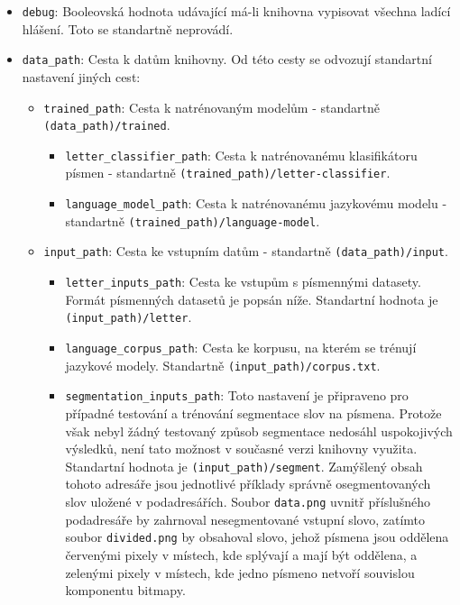 \documentclass[a4paper]{article}
\begin{document}
\begin{itemize}
\item \texttt{debug}: Booleovská hodnota udávající má-li knihovna vypisovat
	všechna ladící hlášení. Toto se standartně neprovádí.
\item \texttt{data\_path}: Cesta k datům knihovny. Od této cesty se odvozují
	standartní nastavení jiných cest:
	\begin{itemize}
	\item \texttt{trained\_path}: Cesta k natrénovaným modelům - standartně
		\texttt{(data\_path)/trained}.
		\begin{itemize}
		\item \texttt{letter\_classifier\_path}: Cesta k natrénovanému
			klasifikátoru písmen - standartně
			\texttt{(trained\_path)/letter-classifier}.
		\item \texttt{language\_model\_path}: Cesta k natrénovanému
			jazykovému modelu - standartně
			\texttt{(trained\_path)/language-model}.
		\end{itemize}
	\item \texttt{input\_path}: Cesta ke vstupním datům - standartně
		\texttt{(data\_path)/input}.
		\begin{itemize}
		\item \texttt{letter\_inputs\_path}: Cesta ke vstupům s
			písmennými datasety. Formát písmenných datasetů je
			popsán níže. Standartní hodnota je
			\texttt{(input\_path)/letter}.

		\item \texttt{language\_corpus\_path}: Cesta ke korpusu,
			na kterém se trénují jazykové modely.
			Standartně \texttt{(input\_path)/corpus.txt}.

		\item
			\texttt{segmentation\_inputs\_path}: Toto nastavení
			je připraveno pro případné testování a trénování
			segmentace slov na písmena. Protože však nebyl
			žádný testovaný způsob segmentace nedosáhl uspokojivých
			výsledků, není tato možnost v současné verzi knihovny využita.
			Standartní hodnota je \texttt{(input\_path)/segment}.
			Zamýšlený obsah tohoto adresáře jsou jednotlivé příklady
			správně osegmentovaných slov uložené v podadresářích.
			Soubor \texttt{data.png} uvnitř příslušného podadresáře
			by zahrnoval nesegmentované vstupní slovo, zatímto
			soubor \texttt{divided.png} by obsahoval slovo, jehož
			písmena jsou oddělena červenými pixely v místech, kde
			splývají a mají být oddělena, a zelenými pixely v
			místech, kde jedno písmeno netvoří souvislou komponentu
			bitmapy.
		\end{itemize}
	\end{itemize}
\end{itemize}
\end{document}
